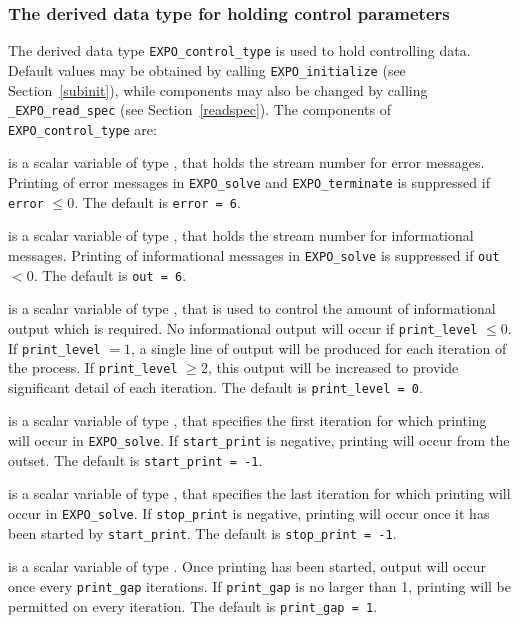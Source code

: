 \documentclass{galahad}
\newcommand{\packagename}{EXPO}
\newcommand{\fullpackagename}{\libraryname\_\packagename}
\begin{document}

\subsubsection{The derived data type for holding control
 parameters}\label{typecontrol}
The derived data type
{\tt \packagename\_control\_type}
is used to hold controlling data. Default values may be obtained by calling
{\tt \packagename\_initialize}
(see Section~\ref{subinit}),
while components may also be changed by calling
{\tt \fullpackagename\_read\-\_spec}
(see Section~\ref{readspec}).
The components of
{\tt \packagename\_control\_type}
are:


\begin{description}

 is a scalar variable of type \integer, that holds the
stream number for error messages. Printing of error messages in
{\tt \packagename\_solve} and {\tt \packagename\_terminate}
is suppressed if {\tt error} $\leq 0$.
The default is {\tt error = 6}.

 is a scalar variable of type \integer, that holds the
stream number for informational messages. Printing of informational messages in
{\tt \packagename\_solve} is suppressed if {\tt out} $< 0$.
The default is {\tt out = 6}.

 is a scalar variable of type \integer, that is used
to control the amount of informational output which is required. No
informational output will occur if {\tt print\_level} $\leq 0$. If
{\tt print\_level} $= 1$, a single line of output will be produced for each
iteration of the process. If {\tt print\_level} $\geq 2$, this output will be
increased to provide significant detail of each iteration.
The default is {\tt print\_level = 0}.

 is a scalar variable of type \integer, that specifies
the first iteration for which printing will occur in {\tt \packagename\_solve}.
If {\tt start\_print} is negative, printing will occur from the outset.
The default is {\tt start\_print = -1}.

 is a scalar variable of type \integer, that specifies
the last iteration for which printing will occur in  {\tt \packagename\_solve}.
If {\tt stop\_print} is negative, printing will occur once it has been
started by {\tt start\_print}.
The default is {\tt stop\_print = -1}.

 is a scalar variable of type \integer.
Once printing has been started, output will occur once every
{\tt print\_gap} iterations. If {\tt print\_gap} is no larger than 1,
printing will be permitted on every iteration.
The default is {\tt print\_gap = 1}.


\end{description}
\end{document}
